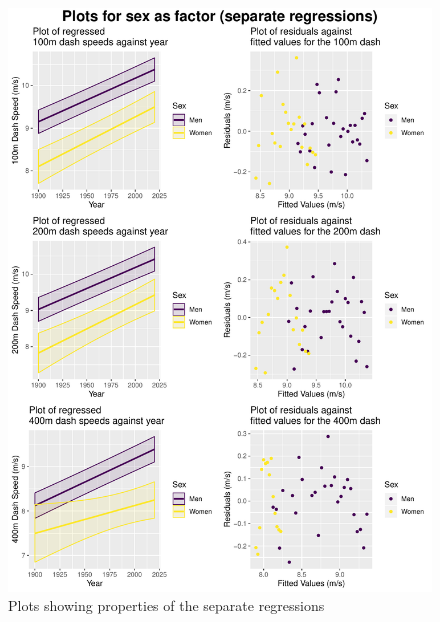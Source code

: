 \documentclass[11pt]{article}
\begin{document}
\begin{figure}
 
  \centering
    \includegraphics[width=\textwidth]{npplots}
 \caption{Plots showing properties of the separate regressions}
\label{fig:npplots}
\end{figure}
\end{document}
